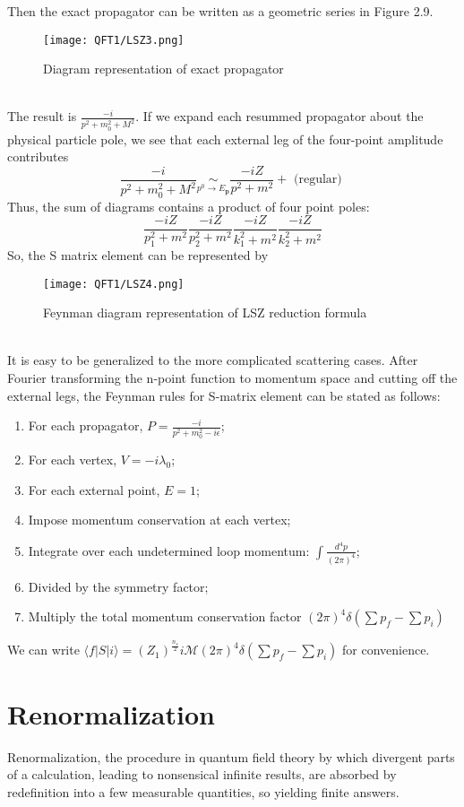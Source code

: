 \noindent
Then the exact propagator can be written as a geometric series in
Figure 2.9.
\begin{figure}[!h]
\centering
\texttt{[image: QFT1/LSZ3.png]}
\caption{Diagram representation of exact propagator}
\end{figure}\\
The result is $\frac{-i}{p^2 + m_0^2 + M^2}$. If we expand each resummed propagator about the physical particle pole, we see that each external leg of the four-point amplitude contributes
\[\frac{-i}{p^2 + m_0^2 + M^2} \underset{p^0 \to E_{\bm{p}}}{\sim} \frac{-iZ}{p^2+m^2} + \mbox{ (regular) }\]
Thus, the sum of diagrams contains a product of four point poles:
\[\frac{-iZ}{p_1^2 + m^2} \frac{-iZ}{p_2^2 + m^2} \frac{-iZ}{k_1^2 + m^2} \frac{-iZ}{k_2^2 + m^2}\]
So, the S matrix element can be represented by 
\begin{figure}[!h]
\centering
\texttt{[image: QFT1/LSZ4.png]}
\caption{Feynman diagram representation of LSZ reduction formula}
\end{figure}\\
It is easy to be generalized to the more complicated scattering cases. After Fourier transforming the n-point function to momentum space and cutting off the external legs, the Feynman rules for S-matrix element can be stated as follows:
\begin{enumerate}
\item For each propagator, $P = \frac{-i}{p^2 + m_0^2 -i\epsilon}$;
\item For each vertex, $V = -i\lambda_0$;
\item For each external point, $E=1$;
\item Impose momentum conservation at each vertex;
\item Integrate over each undetermined loop momentum: $\int \frac{d^4p}{(2\pi)^4}$;
\item Divided by the symmetry factor;
\item Multiply the total momentum conservation factor $(2\pi)^4 \delta(\sum p_f - \sum p_i)$ 
\end{enumerate}
We can write $\langle f | S | i \rangle = (Z_1)^{\frac{n_s}{2}} i \mathcal{M} (2\pi)^4 \delta(\sum p_f - \sum p_i)$ for convenience.

\section{Renormalization}
\noindent
Renormalization, the procedure in quantum field theory by which divergent parts of a calculation, leading to nonsensical infinite results, are absorbed by redefinition into a few measurable quantities, so yielding finite answers.

